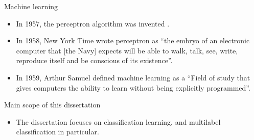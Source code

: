 \documentclass[first=purple,second=dgreen,logo=redexc]{aaltoslides}
\begin{document}
{\begin{frame}{Machine learning}
\begin{itemize}
\begin{center}
		\end{center}
		\item In 1957, the perceptron algorithm was invented \citep{Rosenblatt58}.
		\item In 1958, New York Time wrote perceptron as ``the embryo of an electronic computer that [the Navy] expects will be able to walk, talk, see, write, reproduce itself and be conscious of its existence''.
		\item In 1959, Arthur Samuel defined machine learning as a ``Field of study that gives computers the ability to learn without being explicitly programmed''.
	\end{itemize}
\end{frame}

\begin{frame}{Main scope of this dissertation}
	\begin{itemize}
		\item The dissertation focuses on classification learning, and multilabel classification in particular. 
	\end{itemize}
\end{frame}
	
}
\end{document}
